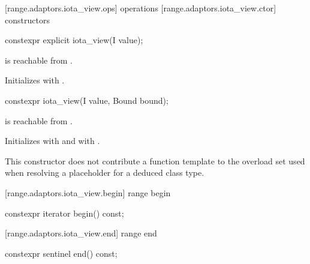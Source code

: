 {[range.adaptors.iota_view.ops]{ operations}
[range.adaptors.iota_view.ctor]{ constructors}

%
\begin{itemdecl}
constexpr explicit iota_view(I value);
\end{itemdecl}

\begin{itemdescr}
\pnum
\oldtxt{\requires} \newtxt{\expects}
 is reachable from .

\pnum
\effects Initializes  with .
\end{itemdescr}

%
\begin{itemdecl}
constexpr iota_view(I value, Bound bound);
\end{itemdecl}

\begin{itemdescr}
\pnum
\oldtxt{\requires} \newtxt{\expects}
 is reachable from .

\pnum
\effects Initializes  with  and  with
.

\pnum
\remarks This constructor does not contribute a function template to the overload
set used when resolving a placeholder for a deduced class
type.
\end{itemdescr}

[range.adaptors.iota_view.begin]{ range begin}

%
\begin{itemdecl}
constexpr iterator begin() const;
\end{itemdecl}

\begin{itemdescr}
\pnum
\oldtxt{\returns} 
\end{itemdescr}

[range.adaptors.iota_view.end]{ range end}

%
\begin{itemdecl}
constexpr sentinel end() const;
\end{itemdecl}

}

